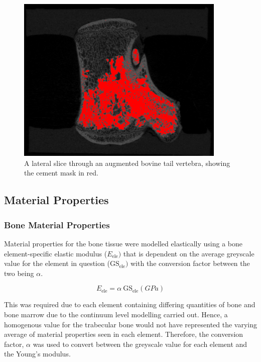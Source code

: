 \begin{figure}[hbt]
\centering

  \includegraphics[width=10cm]{images/fullres_VP_segment.png}
  \caption{A lateral slice through an augmented bovine tail vertebra, showing
the cement mask in red.}
\label{fig:fullressVPseg}
\end{figure}


\subsection{Material Properties}\label{material-properties-bov}

\subsubsection{Bone Material Properties}

Material properties for the bone tissue were modelled elastically using a bone
element-specific elastic modulus (\(E_{\text{ele}})\) that is dependent on the
average greyscale value for the element in question
(\(\text{GS}_{\text{ele}})\) with the conversion factor between the two being
$\alpha$.

\[E_{\text{ele}} = \alpha\ \text{GS}_{\text{ele}} (GPa)\]

This was required due to each element containing differing quantities of bone
and bone marrow due to the continuum level modelling carried out. Hence, a
homogenous value for the trabecular bone would not have represented the varying
average of material properties seen in each element. Therefore, the conversion
factor, $\alpha$ was used to convert between the greyscale value for each
element and the Young's modulus.

